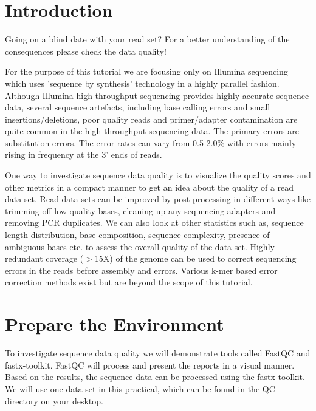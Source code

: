 
\newpage

\section{Introduction}

\begin{note}
Going on a blind date with your read set? For a better understanding of the
consequences please check the data quality!
\end{note}

For the purpose of this tutorial we are focusing only on Illumina sequencing
which uses 'sequence by synthesis' technology in a highly parallel fashion.
Although Illumina high throughput  sequencing provides highly accurate sequence
data, several sequence artefacts, including base calling errors and small
insertions/deletions, poor quality reads and primer/adapter contamination are
quite common in the high throughput sequencing data. The primary errors are
substitution errors. The error rates can vary from 0.5-2.0\% with errors mainly
rising in frequency at the 3' ends of reads.

One way to investigate sequence data quality is to visualize the quality scores
and other metrics in a compact manner to get an idea about the quality of a read
data set. Read data sets can be improved by post processing in different ways
like trimming off low quality bases, cleaning up any sequencing adapters and
removing PCR duplicates. We can also look at other statistics such
as, sequence length distribution, base composition, sequence complexity,
presence of ambiguous bases etc. to assess the overall quality of the data set.
Highly redundant coverage ($>$15X) of the genome can be used to correct sequencing
errors in the reads before assembly and errors. Various k-mer based error
correction methods exist but are beyond the scope of this tutorial.

\section{Prepare the Environment}

\begin{information}
To investigate sequence data quality we will demonstrate tools called FastQC
and fastx-toolkit. FastQC will process and present the reports in a visual manner.
Based on the results, the sequence data can be processed using the fastx-toolkit.
We will use one data set in this practical, which can be found in the QC
directory on your desktop.
\end{information}

